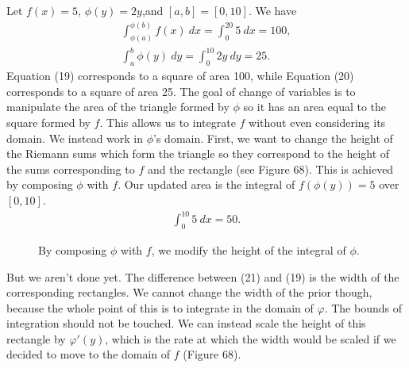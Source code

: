 \documentclass{article}
\theoremstyle{definition}
\begin{document}
Let $ f(x)=5 $, $ \phi(y)=2y $,and $ [a,b]=[0,10] $. We have 
\begin{align}
\int_{\phi(a)}^{\phi(b)}f(x)\ dx=\int_{0}^{20}5\ dx=100,\\\int_{a}^{b}\phi(y)\ dy=\int_{0}^{10}2y \ dy=25.
\end{align}
Equation (19) corresponds to a square of area 100, while Equation (20) corresponds to a square of area 25. The goal of change of variables is to manipulate the area of the triangle formed by $ \phi $ so it has an area equal to the square formed by $ f $. This allows us to integrate $ f $ without even considering its domain. We instead work in $ \phi $'s domain. First, we want to change the height of the Riemann sums which form the triangle so they correspond to the height of the sums corresponding to $ f $ and the rectangle (see Figure 68). This is achieved by composing $ \phi $ with $ f $. Our updated area is the integral of $ f(\phi(y))=5 $ over  $ [0,10] $. 
\begin{align}
 \int_{0}^{10}5\ dx=50.
\end{align}
		\begin{figure}[h!]
	\centering
	\caption{By composing $ \phi $ with $ f $, we modify the height of the integral of $ \phi $.}
\end{figure}
But we aren't done yet. The difference between (21) and (19) is the width of the corresponding rectangles. We cannot change the width of the prior though, because the whole point of this is to integrate in the domain of $ \varphi $. The bounds of integration should not be touched. We can instead scale the height of this rectangle by $ \varphi'(y) $, which is the rate at which the width would be scaled if we decided to move to the domain of $ f $ (Figure 68). 
\end{document}
